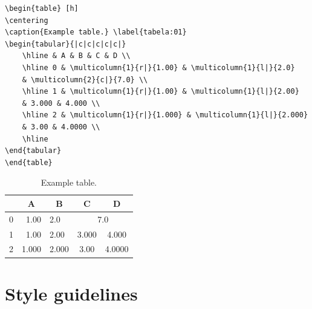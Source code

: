 \documentclass[english]{TCAM} %
\begin{document}
\begin{framed}
\begin{verbatim}
\begin{table} [h]
\centering
\caption{Example table.} \label{tabela:01}
\begin{tabular}{|c|c|c|c|c|}
    \hline & A & B & C & D \\
    \hline 0 & \multicolumn{1}{r|}{1.00} & \multicolumn{1}{l|}{2.0}
    & \multicolumn{2}{c|}{7.0} \\
    \hline 1 & \multicolumn{1}{r|}{1.00} & \multicolumn{1}{l|}{2.00}
    & 3.000 & 4.000 \\
    \hline 2 & \multicolumn{1}{r|}{1.000} & \multicolumn{1}{l|}{2.000}
    & 3.00 & 4.0000 \\
    \hline
\end{tabular}
\end{table}
\end{verbatim}
\end{framed}

\begin{table} [h]
\centering
\caption{Example table.} \label{tabela:01}
\begin{tabular}{|c|c|c|c|c|}
\hline & A & B & C & D \\
\hline 0 & \multicolumn{1}{r|}{1.00} & \multicolumn{1}{l|}{2.0}
& \multicolumn{2}{c|}{7.0} \\
\hline 1 & \multicolumn{1}{r|}{1.00} & \multicolumn{1}{l|}{2.00}
& 3.000 & 4.000 \\
\hline 2 & \multicolumn{1}{r|}{1.000} & \multicolumn{1}{l|}{2.000}
& 3.00 & 4.0000 \\
\hline
\end{tabular}
\end{table}

\newpage

\section{Style guidelines}
\end{document}
